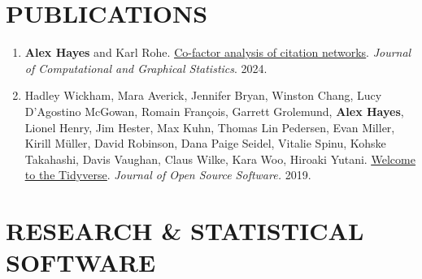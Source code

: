 \documentclass[11pt]{article}
\newcommand{\underlinedlink}[2]{\href{#1}{\ul{#2}}}
\begin{document}
\section*{PUBLICATIONS}


\begin{enumerate}
    \item \textbf{Alex Hayes} and Karl Rohe. \underlinedlink{http://www.tandfonline.com/10.1080/10618600.2024.2394464}{Co-factor analysis of citation networks}. \emph{Journal of Computational and Graphical Statistics}. 2024.
    \item Hadley Wickham, Mara Averick, Jennifer Bryan, Winston Chang, Lucy D'Agostino McGowan, Romain François, Garrett Grolemund, \textbf{Alex Hayes}, Lionel Henry, Jim Hester, Max Kuhn, Thomas Lin Pedersen, Evan Miller, Kirill Müller, David Robinson, Dana Paige Seidel, Vitalie Spinu, Kohske Takahashi, Davis Vaughan, Claus Wilke, Kara Woo, Hiroaki Yutani. \underlinedlink{https://joss.theoj.org/papers/10.21105/joss.01686}{Welcome to the Tidyverse}. \emph{Journal of Open Source Software.} 2019.
\end{enumerate}

\section*{RESEARCH \& STATISTICAL SOFTWARE}
\end{document}
